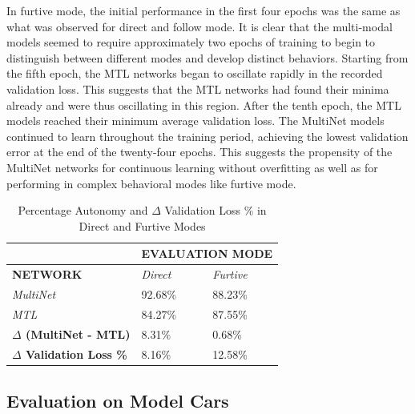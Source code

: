 In furtive mode, the initial performance in the first four epochs was the same as what was observed for direct and follow mode. It is clear that the multi-modal models seemed to require approximately two epochs of training to begin to distinguish between different modes and develop distinct behaviors. Starting from the fifth epoch, the MTL networks began to oscillate rapidly in the recorded validation loss. This suggests that the MTL networks had found their minima already and were thus oscillating in this region. After the tenth epoch, the MTL models reached their minimum average validation loss. The MultiNet models continued to learn throughout the training period, achieving the lowest validation error at the end of the twenty-four epochs. This suggests the propensity of the MultiNet networks for continuous learning without overfitting as well as for performing in complex behavioral modes like furtive mode.

\begin{table}[]
\begin{center}
\begin{tabular}{l|l|l|}
\cline{2-3}
                                                         & \multicolumn{2}{l|}{\textbf{EVALUATION MODE}} \\ \hline
\multicolumn{1}{|l|}{\textbf{NETWORK}}                   & \textit{Direct}       & \textit{Furtive}      \\ \hline
\multicolumn{1}{|l|}{\textit{MultiNet}}                  & 92.68\%               & 88.23\%               \\ \hline
\multicolumn{1}{|l|}{\textit{MTL}}                       & 84.27\%               & 87.55\%               \\ \hline
\multicolumn{1}{|l|}{\textbf{$\Delta$ (MultiNet - MTL)}} & 8.31\%                & 0.68\%                \\ \hline\hline
\multicolumn{1}{|l|}{\textbf{$\Delta$ Validation Loss \%}} & 8.16\%                & 12.58\%                \\ \hline
\end{tabular}
\end{center}
\caption{Percentage Autonomy and $\Delta$ Validation Loss \% in Direct and Furtive Modes}
\label{resultsauto}
\end{table}

\subsection{Evaluation on Model Cars}

